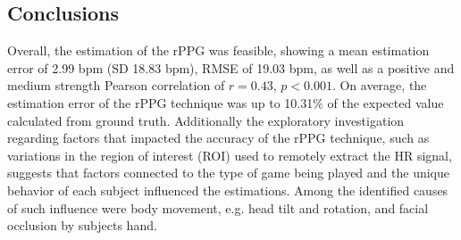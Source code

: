 \subsection{Conclusions}

Overall, the estimation of the rPPG was feasible, showing a mean estimation error of 2.99 bpm (SD 18.83 bpm), RMSE of 19.03 bpm, as well as a positive and medium strength Pearson correlation of $r=0.43$, $p < 0.001$. On average, the estimation error of the rPPG technique was up to 10.31\% of the expected value calculated from ground truth. Additionally the exploratory investigation regarding factors that impacted the accuracy of the rPPG technique, such as variations in the region of interest (ROI) used to remotely extract the HR signal, suggests that factors connected to the type of game being played and the unique behavior of each subject influenced the estimations. Among the identified causes of such influence were body movement, e.g. head tilt and rotation, and facial occlusion by subjects hand.
